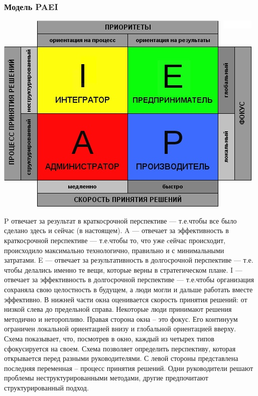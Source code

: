 \documentclass{../industrial-development}
\begin{document}
{\begin{frame} \frametitle{Модель PAEI}
{\includegraphics[width=0.95\linewidth]{paei.png}}
\end{frame}
\lecturenotes
P отвечает за результат в краткосрочной перспективе — т.е.чтобы все было сделано здесь и сейчас (в настоящем).
A — отвечает за эффективность в краткосрочной перспективе — т.е.чтобы то, что уже cейчас происходит, происходило максимально технологично, правильно и с минимальными затратами.
E — отвечает за результативность в долгосрочной перспективе — т.е. чтобы делались именно те вещи, которые верны в стратегическом плане.
I — отвечает за эффективность в долгосрочной перспективе — т.е.чтобы организация сохраняла свою целостность в будущем, а люди могли и дальше работать вместе эффективно.
В нижней части окна оценивается скорость принятия решений: от низкой слева до предельной справа. Некоторые люди принимают решения методично и неторопливо.
Правая сторона окна – это фокус. Его континуум ограничен локальной ориентацией внизу и глобальной ориентацией вверху. Схема показывает, что, посмотрев в окно, каждый из четырех типов сфокусируется на своем. Схема позволяет определить перспективу, которая открывается перед разными руководителями.
С левой стороны представлена последняя переменная – процесс принятия решений. Одни руководители решают проблемы неструктурированными методами, другие предпочитают структурированный подход. 


}
\end{document}
